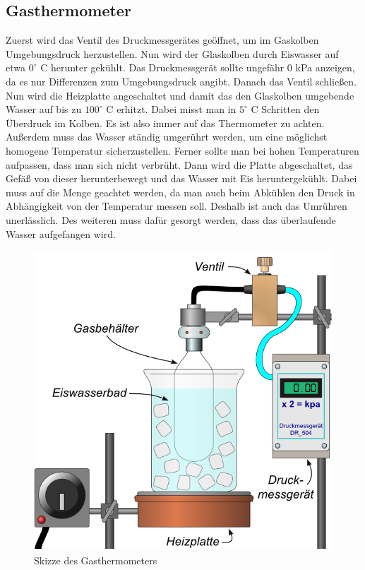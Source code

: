 \documentclass[12pt,a4paper,titlepage,headinclude,bibtotoc]{scrartcl}
\begin{document}
\subsection{Gasthermometer}
Zuerst wird das Ventil des Druckmessgerätes geöffnet, um im Gaskolben Umgebungsdruck herzustellen.
Nun wird der Glaskolben durch Eiswasser auf etwa $0^\circ$ C herunter gekühlt.
Das Druckmessgerät sollte ungefähr 0 kPa anzeigen, da es nur Differenzen zum Umgebungsdruck angibt. Danach das Ventil schließen.\\
Nun wird die Heizplatte angeschaltet und damit das den Glaskolben umgebende Wasser auf bis zu $100^\circ$ C erhitzt.
Dabei misst man in $5^\circ$ C Schritten den Überdruck im Kolben.
Es ist also immer auf das Thermometer zu achten.
Außerdem muss das Wasser ständig umgerührt werden, um eine möglichst homogene Temperatur sicherzustellen.
Ferner sollte man bei hohen Temperaturen aufpassen, dass man sich nicht verbrüht.
Dann wird die Platte abgeschaltet, das Gefäß von dieser herunterbewegt und das Wasser mit Eis heruntergekühlt.
Dabei muss auf die Menge geachtet werden, da man auch beim Abkühlen den Druck in Abhängigkeit von der Temperatur messen soll.
Deshalb ist auch das Umrühren unerlässlich.
Des weiteren muss dafür gesorgt werden, dass das überlaufende Wasser aufgefangen wird. 
\begin{figure}[!h]
 \centering
 \includegraphics[scale=0.7]{GasthermometerSkizze.jpg}
 \caption{Skizze des Gasthermometers \cite{lp}}
 \label{fig:GTSkizze}
\end{figure}
\end{document}
